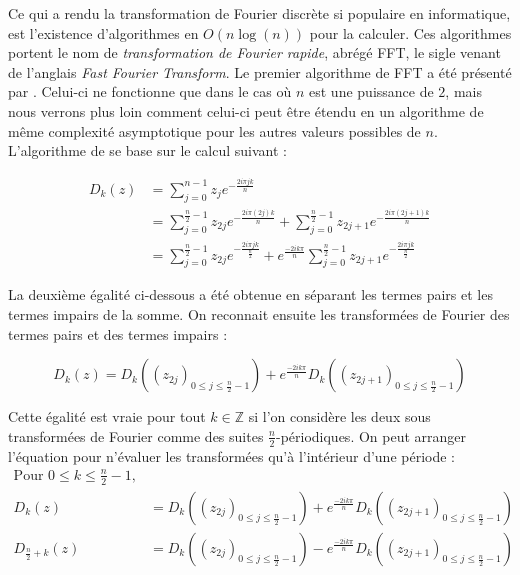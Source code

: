 \documentclass{article}
\begin{document}
Ce qui a rendu la transformation de Fourier discrète si populaire en informatique, est l'existence d'algorithmes en $O(n\log(n))$ pour la calculer. Ces algorithmes portent le nom de \emph{transformation de Fourier rapide}, abrégé FFT, le sigle venant de l'anglais \emph{Fast Fourier Transform}. 
Le premier algorithme de FFT a été présenté par  . Celui-ci ne fonctionne que dans le cas où $n$ est une puissance de $2$, mais nous verrons plus loin comment celui-ci peut être étendu en un algorithme de même complexité asymptotique pour les autres valeurs possibles de $n$. L'algorithme de \cite{FFT} se base sur le calcul suivant :

\begin{align*}
  D_k(z)  &= \sum_{j=0}^{n-1}z_j e^{-\frac{2i \pi j k}{n}} \\
          &= \sum_{j=0}^{\frac{n}{2}-1}z_{2j} e^{-\frac{2i \pi (2j) k}{n}} 
          +  \sum_{j=0}^{\frac{n}{2}-1}z_{2j+1} e^{-\frac{2i \pi (2j+1) k}{n}} \\
          &= \sum_{j=0}^{\frac{n}{2}-1}z_{2j} e^{-\frac{2i \pi j k}{\frac{n}{2}}} 
          +  e^{\frac{-2ik\pi}{n}}\sum_{j=0}^{\frac{n}{2}-1}z_{2j+1} e^{-\frac{2i \pi j k}{\frac{n}{2}}}
\end{align*}

La deuxième égalité ci-dessous a été obtenue en séparant les termes pairs et les termes impairs de la somme. On reconnait ensuite les transformées de Fourier des termes pairs et des termes impairs : 

\begin{equation*}
  D_k(z) = D_k\left((z_{2j})_{0 \le j \le \frac{n}{2}-1}\right)
          +  e^{\frac{-2ik\pi}{n}}D_k\left((z_{2j+1})_{0 \le j \le \frac{n}{2}-1}\right)
\end{equation*}

Cette égalité est vraie pour tout $k\in\mathbb{Z}$ si l'on considère les deux sous transformées de Fourier comme des suites $\frac{n}{2}$-périodiques. On peut arranger l'équation pour n'évaluer les transformées qu'à l'intérieur d'une période : 
\begin{align}
  \text{Pour }0 \le k \le \frac{n}{2}-1, \nonumber\\
  D_k(z) &= D_k\left((z_{2j})_{0 \le j \le \frac{n}{2}-1}\right)
          +  e^{\frac{-2ik\pi}{n}}D_k\left((z_{2j+1})_{0 \le j \le \frac{n}{2}-1}\right)
        \label{cooley} \\
  D_{\frac{n}{2} + k}(z) &= D_k\left((z_{2j})_{0 \le j \le \frac{n}{2}-1}\right)
          -  e^{\frac{-2ik\pi}{n}}D_k\left((z_{2j+1})_{0 \le j \le \frac{n}{2}-1}\right)\nonumber
\end{align}
\end{document}
